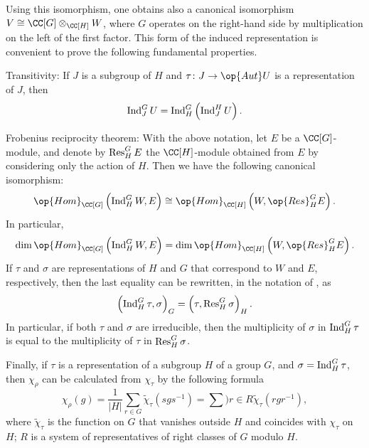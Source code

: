 \documentclass[../main.tex]{subfiles}
\begin{document}
Using this isomorphism, one obtains also a canonical isomorphism $V\cong\CC[G]\otimes_{\CC[H]}W$, where $G$ operates on the right-hand side by multiplication on the left of the first factor. This form of the induced representation is convenient to prove the following fundamental properties.
\begin{listalph}
	\item Transitivity: If $J$ is a subgroup of $H$ and $\tau\colon J\to\op{Aut}U$ is a representation of $J$, then
	\[\operatorname{Ind}^G_JU=\operatorname{Ind}^G_H\left(\operatorname{Ind}^H_JU\right).\]
	\item Frobenius reciprocity theorem: With the above notation, let $E$ be a $\CC[G]$-module, and denote by $\operatorname{Res}^G_HE$ the $\CC[H]$-module obtained from $E$ by considering only the action of $H$. Then we have the following canonical isomorphism:
	\[\op{Hom}_{\CC[G]}\left(\Ind^G_HW,E\right)\cong\op{Hom}_{\CC[H]}\left(W,\op{Res}^G_HE\right).\]
	In particular,
	\[\dim\op{Hom}_{\CC[G]}\left(\Ind^G_HW,E\right)=\dim\op{Hom}_{\CC[H]}\left(W,\op{Res}^G_HE\right).\]
	If $\tau$ and $\sigma$ are representations of $H$ and $G$ that correspond to $W$ and $E$, respectively, then the last equality can be rewritten, in the notation of , as
	\[\left(\operatorname{Ind}^G_H\tau,\sigma\right)_G=\left(\tau,\operatorname{Res}^G_H\sigma\right)_H.\]
	In particular, if both $\tau$ and $\sigma$ are irreducible, then the multiplicity of $\sigma$ in $\operatorname{Ind}^G_H\tau$ is equal to the multiplicity of $\tau$ in $\operatorname{Res}^G_H\sigma$.
\end{listalph}
Finally, if $\tau$ is a representation of a subgroup $H$ of a group $G$, and $\sigma=\operatorname{Ind}^G_H\tau$, then $\chi_\rho$ can be calculated from $\chi_\tau$ by the following formula
\[\chi_\rho(g)=\frac1{|H|}\sum_{r\in G}\widetilde\chi_\tau\left(sgs^{-1}\right)=\sum){r\in R}\widetilde\chi_\tau\left(rgr^{-1}\right),\]
where $\widetilde\chi_\tau$ is the function on $G$ that vanishes outside $H$ and coincides with $\chi_\tau$ on $H$; $R$ is a system of representatives of right classes of $G$ modulo $H$.
\end{document}
